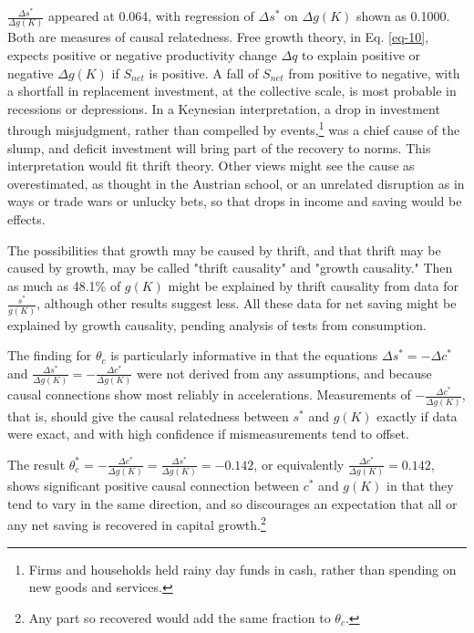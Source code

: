 \documentclass[a4paper,fleqn]{latex_styles/cas-sc}
\begin{document}
\(\frac{\Delta s^*}{\Delta g(K)}\) appeared at 0.064, with regression of \(\Delta s^*\) on \(\Delta g(K)\) shown as 0.1000. Both are measures of causal relatedness. Free growth theory, in Eq. \eqref{eq-10}, expects positive or negative productivity change \(\Delta q\) to explain positive or negative \(\Delta g(K)\) if \(S_{net}\) is positive. A fall of \(S_{net}\) from positive to negative, with a shortfall in replacement investment, at the collective scale, is most probable in recessions or depressions. In a Keynesian interpretation, a drop in investment through misjudgment, rather than compelled by events,\footnote{Firms and households held rainy day funds in cash, rather than spending on new goods and services.} was a chief cause of the slump, and deficit investment will bring part of the recovery to norms. This interpretation would fit thrift theory. Other views might see the cause as overestimated, as thought in the Austrian school, or an unrelated disruption as in ways or trade wars or unlucky bets, so that drops in income and saving would be effects.

The possibilities that growth may be caused by thrift, and that thrift may be caused by growth, may be called "thrift causality" and "growth causality." Then as much as 48.1\% of \(g(K)\) might be explained by thrift causality from data for \(\frac{s^*}{g(K)}\), although other results suggest less. All these data for net saving might be explained by growth causality, pending analysis of tests from consumption. 

The finding for \(\theta_c\) is particularly informative in that the equations \(\Delta s^* = -\Delta c^*\) and \(\frac{\Delta s^*}{\Delta g(K)} = - \frac{\Delta c^*}{\Delta g(K)}\) were not derived from any assumptions, and because causal connections show most reliably in accelerations. Measurements of \(-\frac{\Delta c^*}{\Delta g(K)}\), that is, should give the causal relatedness between \(s^*\) and \(g(K)\) exactly if data were exact, and with high confidence if mismeasurements  tend to offset.

The result \(\theta_c^* = - \frac{\Delta c^*}{\Delta g(K)} = \frac{\Delta s^*}{\Delta g(K)} = -0.142\), or equivalently \(\frac{\Delta c^*}{\Delta g(K)} = 0.142\), shows significant positive causal connection between \(c^*\) and \(g(K)\) in that they tend to vary in the same direction, and so discourages an expectation that all or any net saving is recovered in capital growth.\footnote{Any part so recovered would add the same fraction to \(\theta_c\).}
\end{document}
